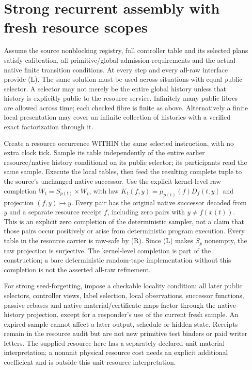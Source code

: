 \documentclass[11pt]{article}
\begin{document}
\section{Strong recurrent assembly with fresh resource scopes}
Assume the source nonblocking registry, full controller table and its selected plans satisfy calibration, all primitive/global admission requirements and the actual native finite transition conditions. At every step and every all-raw interface provide (L). The same solution must be used across situations with equal public selector. A selector may not merely be the entire global history unless that history is explicitly public to the resource service. Infinitely many public fibres are allowed across time; each checked fibre is finite as above. Alternatively a finite local presentation may cover an infinite collection of histories with a verified exact factorization through it.

Create a resource occurrence WITHIN the same selected instruction, with no extra clock tick. Sample its table independently of the entire earlier resource/native history conditional on its public selector; its participants read the same sample. Execute the local tables, then feed the resulting complete tuple to the source's unchanged native successor. Use the explicit kernel-level raw completion $\widetilde W_t=S_{p(t)}\times W_t$, with law $\widetilde K_t(f,y)=\mu_{p(t)}(f)D_f(t,y)$ and projection $(f,y)\mapsto y$. Every pair has the original native successor decoded from $y$ and a separate resource receipt $f$, including zero pairs with $y\ne f(x(t))$. This is an explicit zero completion of the deterministic sampler, not a claim that those pairs occur positively or arise from deterministic program execution. Every table in the resource carrier is raw-safe by (R). Since (L) makes $S_p$ nonempty, the raw projection is surjective. The kernel-level completion is part of the construction; a bare deterministic random-tape implementation without this completion is not the asserted all-raw refinement.

For strong seed-forgetting, impose a checkable locality condition: all later public selectors, controller views, label selection, local observations, successor functions, passive rebases and native material/certificate maps factor through the native-history projection, except for a responder's use of the current fresh sample. An expired sample cannot affect a later output, schedule or hidden state. Receipts remain in the resource audit but are not new primitive test binders or paid writer letters. The supplied resource here has a separately declared unit material interpretation; a nonunit physical resource cost needs an explicit additional coefficient and is outside this unit-resource interpretation.
\end{document}
